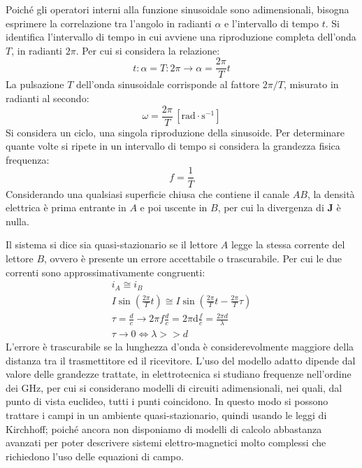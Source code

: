 \documentclass{article}
\newcommand{\vect}[1]{\boldsymbol{\mathbf{#1}}}
\newcommand{\df}{\mathrm{d}}
\newcommand{\SI}[1]{\mathrm{#1}}
\numberwithin{equation}{subsection}
\begin{document}
Poiché gli operatori interni alla funzione sinusoidale sono adimensionali, bisogna esprimere la correlazione tra l'angolo in radianti $\alpha$ e l'intervallo di tempo $t$. 
Si identifica l'intervallo di tempo in cui avviene una riproduzione completa dell'onda $T$, in radianti $2\pi$. Per cui si considera la relazione:
\begin{equation*}
    t:\alpha=T:2\pi\to\displaystyle\alpha=\frac{2\pi}{T}t
\end{equation*}
La pulsazione $T$ dell'onda sinusoidale corrisponde al fattore ${2\pi}/T$, misurato in radianti al secondo:
\begin{equation*}
    \omega=\displaystyle\frac{2\pi}{T}\,\left[\SI{rad}\cdot\SI{s}^{-1}\right]
\end{equation*}
Si considera un ciclo, una singola riproduzione della sinusoide. Per determinare quante volte si ripete in un intervallo di tempo si considera la grandezza fisica frequenza:
\begin{equation*}
    f=\displaystyle\frac{1}{T}
\end{equation*}
Considerando una qualsiasi superficie chiusa che contiene il canale $AB$, la densità elettrica è prima entrante in $A$ e poi uscente in $B$, per cui la divergenza di $\vect{J}$ 
è nulla.


Il sistema si dice sia quasi-stazionario se il lettore $A$ legge la stessa corrente del lettore $B$, ovvero è presente un errore accettabile o trascurabile. 
Per cui le due correnti sono approssimativamente congruenti:
\begin{gather*}
    i_A\cong i_B\\
    I\sin\displaystyle\left(\frac{2\pi}{T}t\right)\cong I\sin\left(\frac{2\pi}{T}t-\frac{2\pi}{T}\tau\right)\\
    \tau=\displaystyle\frac{d}{c}\to \displaystyle 2\pi f\frac{d}{c}=2\pi \df\frac{f}{c}=\frac{2\pi d}{\lambda}\\
    \tau\to 0\iff \lambda>>d
\end{gather*}
L'errore è trascurabile se la lunghezza d'onda è considerevolmente maggiore della distanza tra il trasmettitore ed il ricevitore. 
L'uso del modello adatto dipende dal valore delle grandezze trattate, in elettrotecnica si studiano frequenze nell'ordine dei GHz, per cui si considerano modelli di circuiti adimensionali, nei quali, dal punto di vista euclideo, tutti i punti coincidono. In questo modo si possono 
trattare i campi in un ambiente quasi-stazionario, quindi usando le leggi di Kirchhoff; poiché ancora non disponiamo di modelli di calcolo abbastanza avanzati per poter 
descrivere sistemi elettro-magnetici molto complessi che richiedono l'uso delle equazioni di campo. 
\end{document}
